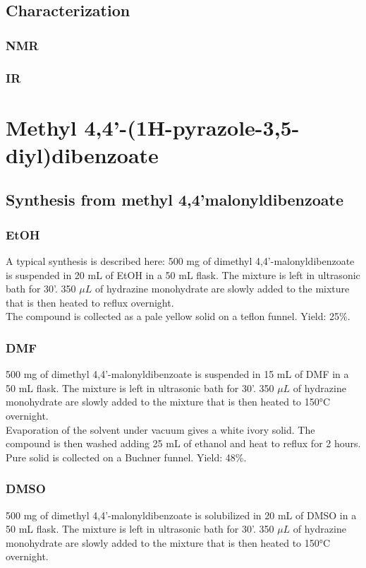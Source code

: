 \documentclass[../Master.tex]{subfiles}
\begin{document}
\newpage
\subsection{Characterization}
\subsubsection{NMR}


\subsubsection{IR}


\newpage
\section{Methyl 4,4'-(1H-pyrazole-3,5-diyl)dibenzoate}
\subsection{Synthesis from methyl 4,4'malonyldibenzoate}
\subsubsection{EtOH}
A typical synthesis is described here:
500 mg of dimethyl 4,4'-malonyldibenzoate is suspended in 20 mL of EtOH in a 50 mL flask. The mixture is left in ultrasonic bath for 30'. 350 \(\mu L\) of hydrazine monohydrate are slowly added to the mixture that is then heated to reflux overnight.\\
The compound is collected as a pale yellow solid on a teflon funnel. Yield: 25\%.
\subsubsection{DMF}
500 mg of dimethyl 4,4'-malonyldibenzoate is suspended in 15 mL of DMF in a 50 mL flask. The mixture is left in ultrasonic bath for 30'. 350 \(\mu L\) of hydrazine monohydrate are slowly added to the mixture that is then heated to 150°C overnight.\\
Evaporation of the solvent under vacuum gives a white ivory solid. The compound is then washed adding 25 mL of ethanol and heat to reflux for 2 hours. Pure solid is collected on a Buchner funnel. Yield: 48\%.
\subsubsection{DMSO}
500 mg of dimethyl 4,4'-malonyldibenzoate is solubilized in 20 mL of DMSO in a 50 mL flask. The mixture is left in ultrasonic bath for 30'. 350 \(\mu L\) of hydrazine monohydrate are slowly added to the mixture that is then heated to 150°C overnight.\\
\pagebreak
\end{document}
